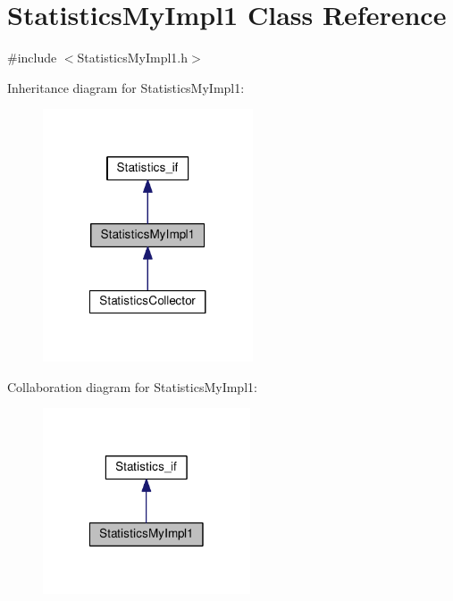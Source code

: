 \hypertarget{class_statistics_my_impl1}{\section{Statistics\-My\-Impl1 Class Reference}
\label{class_statistics_my_impl1}
}


{\ttfamily \#include $<$Statistics\-My\-Impl1.\-h$>$}



Inheritance diagram for Statistics\-My\-Impl1\-:\nopagebreak
\begin{figure}[H]
\begin{center}
\leavevmode
\includegraphics[width=176pt]{class_statistics_my_impl1__inherit__graph}
\end{center}
\end{figure}


Collaboration diagram for Statistics\-My\-Impl1\-:\nopagebreak
\begin{figure}[H]
\begin{center}
\leavevmode
\includegraphics[width=174pt]{class_statistics_my_impl1__coll__graph}
\end{center}
\end{figure}
